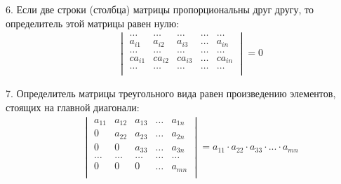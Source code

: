 \documentclass[12pt, fleqn]{extarticle}
\begin{document}
6. Если две строки (столбца) матрицы пропорциональны друг другу, то определитель этой матрицы равен нулю:
\begin{align*}
     &  &
    \begin{vmatrix}
        \dots   & \dots   & \dots   & \dots & \dots   \\
        a_{i1}  & a_{i2}  & a_{i3}  & \dots & a_{in}  \\
        \dots   & \dots   & \dots   & \dots & \dots   \\
        ca_{i1} & ca_{i2} & ca_{i3} & \dots & ca_{in} \\
        \dots   & \dots   & \dots   & \dots & \dots   \\
    \end{vmatrix}
    = 0
\end{align*}

7. Определитель матрицы треугольного вида равен произведению элементов, стоящих на главной диагонали:
\begin{align*}
     &  &
    \begin{vmatrix}
        a_{11} & a_{12} & a_{13} & \dots & a_{1n} \\
        0      & a_{22} & a_{23} & \dots & a_{2n} \\
        0      & 0      & a_{33} & \dots & a_{3n} \\
        \dots  & \dots  & \dots  & \dots & \dots  \\
        0      & 0      & 0      & \dots & a_{mn} \\
    \end{vmatrix}
    = a_{11} \cdot a_{22} \cdot a_{33} \cdot ... \cdot a_{mn}
\end{align*}
\end{document}

